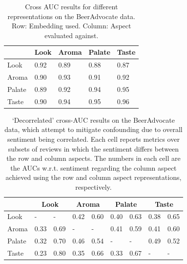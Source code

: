 \documentclass[11pt,a4paper]{article}
\begin{document}
\begin{table}%
\vspace{-.25em}
\footnotesize
    \centering
    \begin{tabularx}{\columnwidth}{ l X X X X }
     & Look & Aroma & Palate & Taste \\ \hline
    Look & 0.92 & 0.89 & 0.88 & 0.87 \\ 
    Aroma & 0.90 & 0.93 & 0.91 & 0.92 \\ 
    Palate & 0.89 & 0.92 & 0.94 & 0.95 \\ 
    Taste & 0.90 & 0.94 & 0.95 & 0.96 \\ 
    \end{tabularx}
    \caption{Cross AUC results for different representations on the BeerAdvocate data. Row: Embedding used. Column: Aspect evaluated against. }
    \label{table:beercrossauc}
\end{table}

\begin{table}%
\setlength{\tabcolsep}{2pt}
\footnotesize
\centering
\begin{tabularx}{\columnwidth}{l|X X|X X|X X|X X}
 & \multicolumn{2}{c|}{Look}  & \multicolumn{2}{c|}{Aroma}  & \multicolumn{2}{c|}{Palate} & \multicolumn{2}{c}{Taste} \\ \hline
Look & - & - & 0.42 &	0.60 & 0.40	& 0.63	& 0.38	& 0.65 \\ %
Aroma & 0.33 & 0.69 & - & - & 0.41 & 0.59 & 0.41 & 0.60 \\ %
Palate & 0.32 & 0.70 & 0.46 & 0.54 & - & - & 0.49 & 0.52 \\ %
Taste & 0.23 & 0.80 & 0.35 & 0.66 & 0.33 & 0.67 & - & - \\
\end{tabularx}
\caption{`Decorrelated' cross-AUC results on the BeerAdvocate data, which attempt to mitigate confounding due to overall sentiment being correlated. Each cell reports metrics over subsets of reviews in which the sentiment differs between the row and column aspects. The numbers in each cell are the AUCs w.r.t. sentiment regarding the column aspect achieved using the row and column aspect representations, respectively.}
\label{table:decorrelated}
\end{table}
\end{document}
